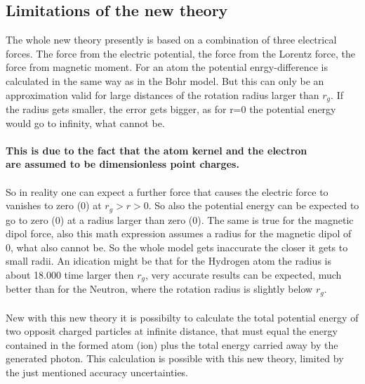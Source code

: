 \documentclass[10pt,titlepage]{article}
\begin{document}
\subsection{Limitations of the new theory}
The whole new theory presently is based on a combination of three electrical forces.
The force from the electric potential, the force from the Lorentz force, the force from magnetic moment.
For an atom the potential enrgy-difference is calculated in the same way as in the Bohr model. But this can only be an approximation valid for large distances of the rotation radius larger than $r_g$. If the radius gets smaller, the error gets bigger, as for r=0 the potential energy would go to infinity, what cannot be.
\\\\
\textbf{This is due to the fact that the atom kernel and the electron \\ are assumed to be dimensionless point charges.}
\\\\
So in reality one can expect a further force that causes the electric force to vanishes to zero (0) at $r_g>r>0$. So also the potential energy can be expected to go to zero (0) at a radius larger than zero (0).  The same is true for the magnetic dipol force, also this math expression assumes a radius for the magnetic dipol of 0, what also cannot be. So the whole model gets inaccurate the closer it gets to small radii.
An idication might be that for the Hydrogen atom the radius is about 18.000 time larger then $r_g$, very accurate results can be expected, much better than for the Neutron, where the rotation radius is slightly below $r_g$. \\\\
New with this new theory it is possibilty to calculate the total potential energy of two opposit charged particles at infinite distance, that must equal the energy contained in the formed atom (ion) plus the total energy carried away by the generated photon. This calculation is possible with this new theory, limited by the just mentioned accuracy uncertainties.
\\\\

\end{document}
